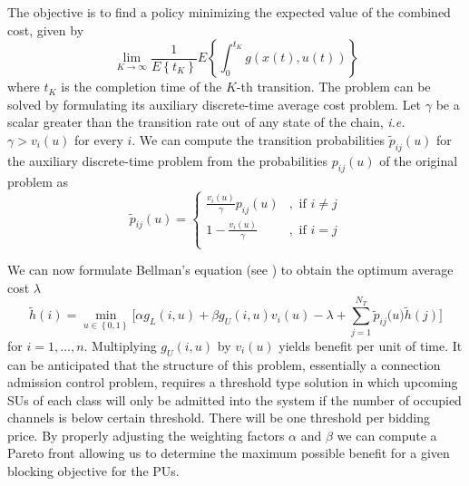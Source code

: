 The objective is to find a policy minimizing the expected value of the combined cost, given by
\begin{equation}	 \lim_{K\rightarrow\infty}\frac{1}{E\left\{t_{K}\right\}}
E\left\{\int^{t_{K}}_{0}g\left(x(t),u(t)\right)\right\}
\end{equation}
where $t_{K}$ is the completion time of the $K$-th transition. The problem can be solved by formulating its auxiliary discrete-time average cost problem. Let $\gamma$ be a scalar greater than the transition rate out of any state of the chain, \textit{i.e.} $\gamma > v_{i}(u)$ for every $i$.
We can compute the transition probabilities $\tilde{p}_{ij}(u)$ for the auxiliary discrete-time problem from the probabilities $p_{ij}(u)$ of the original problem as
\begin{equation}
	  \tilde{p}_{ij}(u) =
	  \begin{cases}
		\frac{v_{i}(u)}{\gamma}p_{ij}(u) &, \text{ if }i \neq j\\	
		1- \frac{v_{i}(u)}{\gamma}&, \text{ if }i = j \\
 \end{cases}
\end{equation}

We can now formulate Bellman's equation (see \cite{ref:Bertsekas2012}) to obtain the optimum average cost $\lambda$
\begin{equation}\label{BellmanEqAuction}
\tilde{h}\left(i\right) = \min_{u\in \left\{0,1\right\}}\biggl[\alpha g_{L}(i,u) + \beta g_{U}(i,u)v_{i}(u) -
 \lambda + \displaystyle\sum_{j=1}^{N_{T}}\tilde{p}_{ij}\bigl(u\bigr)\tilde{h}\left(j\right)\biggr]
\end{equation}
for $i =1,\ldots,n$. Multiplying $g_{U}(i,u)$ by $v_{i}(u)$ yields benefit per unit of time.
It can be anticipated that the structure of this problem, essentially a connection admission control problem, requires a threshold type solution in which upcoming SUs of each class will only be admitted into the system if the number of occupied channels is below certain threshold. There will be one threshold per bidding price. By properly adjusting the weighting factors $\alpha$ and $\beta$ we can compute a Pareto front allowing us to determine the maximum possible benefit for a given blocking objective for the PUs.
 
